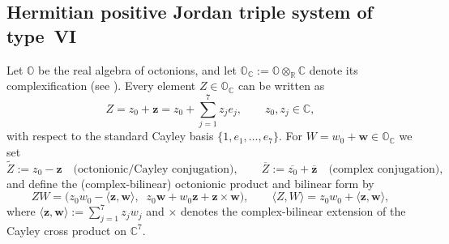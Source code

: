 \documentclass[reqno, 11pt]{amsart}
\begin{document}

\subsection{Hermitian positive Jordan triple system of type~VI}

Let $\mathbb{O}$ be the real algebra of octonions, and let $\mathbb{O}_{\mathbb{C}}:=\mathbb{O}\otimes_{\mathbb{R}}\mathbb{C}$ denote its complexification (see \cite[§3]{BAEZoctonions2002}). Every element $Z\in\mathbb{O}_{\mathbb{C}}$ can be written as
\begin{equation}\label{Zgrande}
Z=z_0+\mathbf z
=
z_0+\sum_{j=1}^{7}z_j e_j,
\qquad z_0,z_j\in\mathbb{C},
\end{equation}
with respect to the standard Cayley basis $\{1,e_1,\dots,e_7\}$. For $W=w_0+\mathbf w\in\mathbb{O}_{\mathbb{C}}$ we set
\[
\widetilde Z:=z_0-\mathbf z
\quad\text{(octonionic/Cayley conjugation)},\qquad
\overline Z:=\overline{z_0}+\overline{\mathbf z}
\quad\text{(complex conjugation)},
\]
and define the (complex-bilinear) octonionic product and bilinear form by
\[
ZW=\bigl(z_0w_0-\langle\mathbf z,\mathbf w\rangle,\;\;
z_0\mathbf w+w_0\mathbf z+\mathbf z\times\mathbf w\bigr),\qquad
\langle Z,W\rangle=z_0w_0+\langle\mathbf z,\mathbf w\rangle,
\]
where $\langle\mathbf z,\mathbf w\rangle:=\sum_{j=1}^7 z_j w_j$ and $\times$ denotes the complex-bilinear extension of the Cayley cross product on $\mathbb{C}^7$.

\medskip
\end{document}
